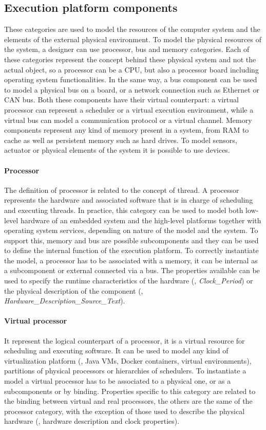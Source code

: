\subsection{Execution platform components}
These categories are used to model the resources of the computer system and the elements of the external physical environment. To model the physical resources of the system, a designer can use processor,  bus and memory categories. Each of these categories represent the concept behind these physical system and not the actual object, so a processor can be a CPU, but also a processor board including operating system functionalities. In the same way, a bus component can be used to model a physical bus on a board, or a network connection such as Ethernet or CAN bus. Both these components have their virtual counterpart: a virtual processor can represent a scheduler or a virtual execution environment, while a virtual bus can model a communication protocol or a virtual channel. Memory components represent any kind of memory present in a system, from RAM to cache as well as persistent memory such as hard drives. To model sensors, actuator or physical elements of the system it is possible to use devices.

\paragraph{Processor} The definition of processor is related to the concept of thread. A processor represents the hardware and associated software that is in charge of scheduling  and executing threads. In practice, this category can be used to model both low-level hardware of an embedded system and the high-level platforms together with operating system services, depending on nature of the model and the system. To support this, memory and bus are possible subcomponents and they can be used to define the internal function of the execution platform. To correctly instantiate the model, a processor has to be associated with a memory, it can be internal as a subcomponent or external connected via a bus. The properties available can be used to specify the runtime characteristics of the hardware (\eg, \textit{Clock\_Period}) or the physical description of the component (\eg, \textit{Hardware\_Description\_Source\_Text}).

\paragraph{Virtual processor} It represent the logical counterpart of a processor, it is a virtual resource for scheduling and executing software. It can be used to model any kind of virtualization platform (\eg, Java VMs, Docker containers, virtual environments), partitions of physical processors or hierarchies of schedulers. To instantiate a model a virtual processor has to be associated to a physical one, or as a subcomponents or by binding. Properties specific to this category are related to the binding between virtual and real processors, the others are the same of the processor category, with the exception of those used to describe the physical hardware (\eg, hardware description and clock properties).

